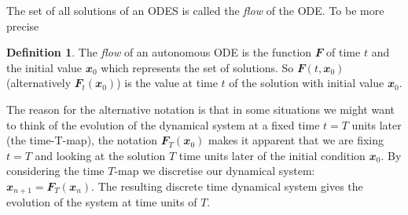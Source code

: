 \documentclass[
  a4paper,
  oneside,
  final]{krantz}
\renewcommand{\v}[1]{{\mathbfit{#1}}}
\theoremstyle{definition}
\newtheorem{definition}{Definition}[chapter]
\theoremstyle{definition}
\theoremstyle{definition}
\theoremstyle{definition}
\theoremstyle{remark}
\begin{document}
The set of all solutions of an ODES is called the \emph{flow} of the ODE. To be more precise

\begin{definition}
The \emph{flow} of an autonomous ODE is the function \(\v{F}\) of time \(t\) and the initial value \(\v{x}_0\) which represents the set of solutions. So \(\v{F}(t, \v{x}_0)\) (alternatively \(\v{F}_{t}(\v{x}_0)\)) is the value at time \(t\) of the solution with initial value \(\v{x}_0\).
\end{definition}

The reason for the alternative notation is that in some situations we might want to think of the evolution of the dynamical system at a fixed time \(t=T\) units later (the time-T-map), the notation \(\v{F}_{T}(\v{x}_0)\) makes it apparent that we are fixing \(t=T\) and looking at the solution \(T\) time units later of the initial condition \(\v{x}_0\). By considering the time \(T\)-map we discretise our dynamical system: \(\v{x}_{n+1} = \v{F}_{T}(\v{x}_{n})\). The resulting discrete time dynamical system gives the evolution of the system at time units of \(T\).
\end{document}
